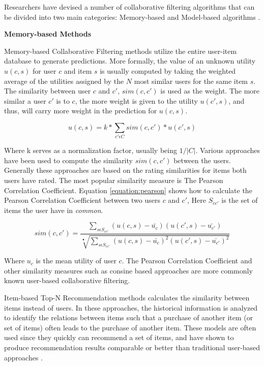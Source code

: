 Researchers have devised a number of collaborative filtering algorithms that can be divided into two main categories: Memory-based and Model-based algorithms \cite{Su2009}.\linebreak[4]

\textbf{Memory-based Methods}

Memory-based Collaborative Filtering methods utilize the entire user-item database to generate predictions. More formally, the value of an unknown utility $u(c,s)$ for user $c$ and item $s$ is usually computed by taking the weighted average of the utilities assigned by the $N$ most similar users for the same item $s$. The similarity between user $c$ and $c'$, $sim(c, c')$ is used as the weight. The more similar a user $c'$ is to $c$, the more weight is given to the utility $u(c', s)$, and thus, will carry more weight in the prediction for $u(c,s)$.

\begin{equation}
\label{equation:cfratingprediction}
u(c,s) = k * \sum_{c' \epsilon C} sim(c, c') * u(c',s)
\end{equation}

Where k serves as a normalization factor, usually being $1/|C|$. Various approaches have been used to compute the similarity $sim(c, c')$ between the users. Generally these approaches are based on the rating similarities for items both users have rated. The most popular similarity measure is The Pearson Correlation Coefficient. Equation \ref{equation:pearson} shows how to calculate the Pearson Correlation Coefficient between two users $c$ and $c'$, Here $S_{cc'}$ is the set of items the user have in \emph{common}.

\begin{equation}
sim(c, c') = \frac{\sum_{s \epsilon S_{cc'}} (u(c, s)-\bar{u_{c}})(u(c',s)-\bar{u_{c'}})}{\sqrt[•]{\sum_{s \epsilon S_{cc'}} (u(c, s)-\bar{u_{c}})^{2}(u(c',s)-\bar{u_{c'}})^{2}}}
\end{equation}

Where $u_{c}$ is the mean utility of user $c$. The Pearson Correlation Coefficient and other similarity measures such as consine based approaches are more commonly known user-based collaborative filtering.\linebreak[4]

Item-based Top-N Recommendation methods calculates the similarity between items instead of users. In these approaches, the historical information is analyzed to identify the relations between items such that a purchase of another item (or set of items) often leads to the purchase of another item. These models are often used since they quickly can recommend a set of items, and have shown to produce recommendation results comparable or better than traditional user-based approaches \cite{Karypis2001}.

